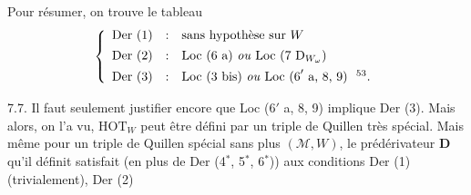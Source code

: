\documentclass[11pt]{article}
\begin{document}
Pour résumer, on trouve le tableau
\[
\left\{
\begin{array}{lcl}
\text{Der (1)} & : & \text{sans hypothèse sur } W \\[1ex]
\text{Der (2)} & : & \text{Loc (6 a) \textit{ou} Loc (7 }\mathrm{D}_{W_\omega}\text{)} \\[1ex]
\text{Der (3)} & : & \text{Loc (3 bis) \textit{ou} Loc (6}'\text{ a, 8, 9)\ \ \footnotemark[53].}
\end{array}
\right.
\]

7.7. Il faut seulement justifier encore que Loc (6$'$ a, 8, 9) implique Der (3). Mais alors, on l'a vu, $\mathrm{HOT}_W$ peut être défini par un triple de Quillen très spécial. Mais même pour un triple de Quillen spécial sans plus $(\mathcal{M},W)$, le prédérivateur $\mathbf{D}$ qu'il définit satisfait (en plus de Der (4$^*$, 5$^*$, 6$^*$)) aux conditions Der (1) (trivialement), Der (2)
\end{document}
